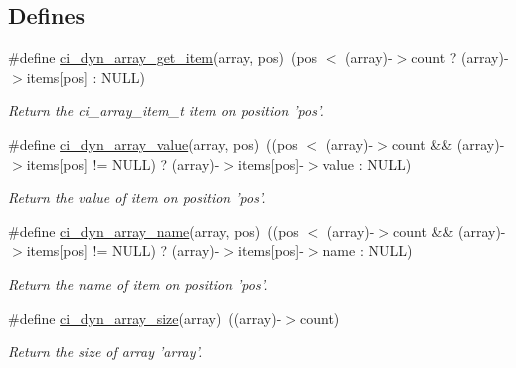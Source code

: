 \subsection*{Defines}
\begin{DoxyCompactItemize}
\item 
\hypertarget{group__DYNAMIC__ARRAYS_ga0b632678eb30c16deeb02e2b0ad3d479}{
\#define \hyperlink{group__DYNAMIC__ARRAYS_ga0b632678eb30c16deeb02e2b0ad3d479}{ci\_\-dyn\_\-array\_\-get\_\-item}(array, pos)~(pos $<$ (array)-\/$>$count ? (array)-\/$>$items\mbox{[}pos\mbox{]} : NULL)}
\label{group__DYNAMIC__ARRAYS_ga0b632678eb30c16deeb02e2b0ad3d479}

\begin{DoxyCompactList}\small\item\em Return the ci\_\-array\_\-item\_\-t item on position 'pos'. \item\end{DoxyCompactList}\item 
\hypertarget{group__DYNAMIC__ARRAYS_ga2aaf025d3cbc8c54073280780419f648}{
\#define \hyperlink{group__DYNAMIC__ARRAYS_ga2aaf025d3cbc8c54073280780419f648}{ci\_\-dyn\_\-array\_\-value}(array, pos)~((pos $<$ (array)-\/$>$count \&\& (array)-\/$>$items\mbox{[}pos\mbox{]} != NULL) ?  (array)-\/$>$items\mbox{[}pos\mbox{]}-\/$>$value : NULL)}
\label{group__DYNAMIC__ARRAYS_ga2aaf025d3cbc8c54073280780419f648}

\begin{DoxyCompactList}\small\item\em Return the value of item on position 'pos'. \item\end{DoxyCompactList}\item 
\hypertarget{group__DYNAMIC__ARRAYS_ga943afc4c55e06a7f9ce1ef7e6f0f8c44}{
\#define \hyperlink{group__DYNAMIC__ARRAYS_ga943afc4c55e06a7f9ce1ef7e6f0f8c44}{ci\_\-dyn\_\-array\_\-name}(array, pos)~((pos $<$ (array)-\/$>$count \&\& (array)-\/$>$items\mbox{[}pos\mbox{]} != NULL) ?  (array)-\/$>$items\mbox{[}pos\mbox{]}-\/$>$name : NULL)}
\label{group__DYNAMIC__ARRAYS_ga943afc4c55e06a7f9ce1ef7e6f0f8c44}

\begin{DoxyCompactList}\small\item\em Return the name of item on position 'pos'. \item\end{DoxyCompactList}\item 
\hypertarget{group__DYNAMIC__ARRAYS_ga5061a887987e9881b29c665d5a2429fb}{
\#define \hyperlink{group__DYNAMIC__ARRAYS_ga5061a887987e9881b29c665d5a2429fb}{ci\_\-dyn\_\-array\_\-size}(array)~((array)-\/$>$count)}
\label{group__DYNAMIC__ARRAYS_ga5061a887987e9881b29c665d5a2429fb}

\begin{DoxyCompactList}\small\item\em Return the size of array 'array'. \item\end{DoxyCompactList}\end{DoxyCompactItemize}
